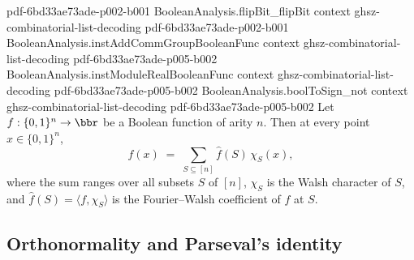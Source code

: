 \begin{theorem}
  {pdf-6bd33ae73ade-p002-b001}
\proofstep
  {BooleanAnalysis.flipBit_flipBit}
  {context}
  {ghsz-combinatorial-list-decoding}
  {pdf-6bd33ae73ade-p002-b001}
\proofstep
  {BooleanAnalysis.instAddCommGroupBooleanFunc}
  {context}
  {ghsz-combinatorial-list-decoding}
  {pdf-6bd33ae73ade-p005-b002}
\proofstep
  {BooleanAnalysis.instModuleRealBooleanFunc}
  {context}
  {ghsz-combinatorial-list-decoding}
  {pdf-6bd33ae73ade-p005-b002}
\proofstep
  {BooleanAnalysis.boolToSign_not}
  {context}
  {ghsz-combinatorial-list-decoding}
  {pdf-6bd33ae73ade-p005-b002}
Let $f:\{0,1\}^n\to\bbr$ be a Boolean function of arity $n$. Then at every point
$x\in\{0,1\}^n$,
\[
  f(x) \;=\; \sum_{S\subseteq[n]} \hat f(S)\,\chi_S(x),
\]
where the sum ranges over all subsets $S$ of $[n]$, $\chi_S$ is the Walsh character of
$S$, and $\hat f(S)=\langle f,\chi_S\rangle$ is the Fourier–Walsh coefficient of $f$ at
$S$.
\end{theorem}

\subsection{Orthonormality and Parseval's identity}

